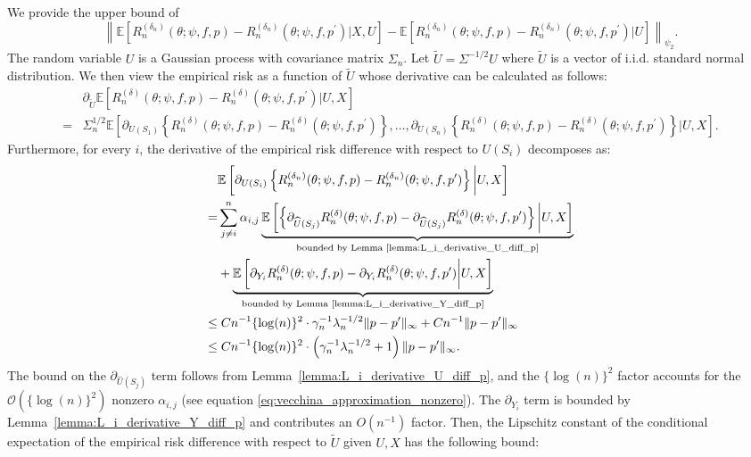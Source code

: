 \documentclass[12pt]{article}
\newcommand{\E}{\mathbb{E}}
\begin{document}
\noindent We provide the upper bound of
$$\left\|\E\left[R_n^{(\delta_n)}(\theta;\psi,f,p)-R_n^{({\delta_n})}(\theta;\psi,f,p^\prime)|X,U\right]-\E\left[R_n^{(\delta_n)}(\theta;\psi,f,p)-R_n^{({\delta_n})}(\theta;\psi,f,p^\prime)|U\right]\right\|_{\psi_2}.$$
The random variable $U$ is a Gaussian process with covariance matrix $\Sigma_n$. Let $\widetilde U=\Sigma^{-1/2} U$ where $\widetilde U$ is a vector of i.i.d. standard normal distribution. We then view the empirical risk as a function of $\widetilde U$ whose derivative can be calculated as follows:
\begin{align*}
    &\partial_{ \widetilde U}\E\left[R_n^{(\delta)}(\theta;\psi,f,p)-R_n^{(\delta)}(\theta;\psi,f,p^\prime)\bigg| U,X\right]\\
    = & \Sigma_n^{1/2}\E\left[\partial_{U(S_1)}\left\{R_n^{(\delta)}(\theta;\psi,f,p)-R_n^{(\delta)}(\theta;\psi,f,p^\prime)\right\},\ldots,\partial_{U(S_n)}\left\{R_n^{(\delta)}(\theta;\psi,f,p)-R_n^{(\delta)}(\theta;\psi,f,p^\prime)\right\}\bigg| U,X\right].
\end{align*}
Furthermore, for every $i$, the derivative of the empirical risk difference with respect to $U(S_i)$ decomposes as:
\begin{align*}
    &\E\left[\partial_{U(S_i)}\left\{R_n^{(\delta_n)}(\theta;\psi,f,p)-R_n^{({\delta_n})}(\theta;\psi,f,p^\prime)\right\}\bigg| U,X\right]\\
    = & \sum_{j\neq i}^n  \alpha_{i,j}\underbrace{\E\left[\left\{\partial_{\widehat U(S_j)}R_n^{(\delta)}(\theta;\psi,f,p)-\partial_{\widehat U(S_j)}R_n^{(\delta)}(\theta;\psi,f,p^\prime)\right\}\bigg| U,X\right]}_{\text{bounded by Lemma \ref{lemma:L_i_derivative_U_diff_p}}}\\
    &+ \underbrace{\E\left[\partial_{Y_i}R_n^{(\delta)}(\theta;\psi,f,p)   - \partial_{Y_i}R_n^{(\delta)}(\theta;\psi,f,p^\prime)\bigg| U,X\right]}_{\text{bounded by Lemma \ref{lemma:L_i_derivative_Y_diff_p}}}\\
    \leq &\;Cn^{-1}\{\log(n)\}^2\cdot\gamma_n^{-1}\lambda_n^{-1/2}\|p-p^\prime\|_\infty + Cn^{-1}\|p-p^\prime\|_\infty\\
    \leq &\;Cn^{-1}\{\log(n)\}^2\cdot\left(\gamma_n^{-1}\lambda_n^{-1/2}+1\right)\|p-p^\prime\|_\infty.
\end{align*}
The bound on the $\partial_{\widehat U(S_j)}$ term follows from Lemma~\ref{lemma:L_i_derivative_U_diff_p}, and the $\{\log(n)\}^2$ factor accounts for the $\mathcal{O}(\{\log(n)\}^2)$ nonzero $\alpha_{i,j}$ (see equation \eqref{eq:vecchina_approximation_nonzero}). The $\partial_{Y_i}$ term is bounded by Lemma~\ref{lemma:L_i_derivative_Y_diff_p} and contributes an $O(n^{-1})$ factor. Then, the Lipschitz constant of the conditional expectation of the empirical risk difference with respect to $\widetilde U$ given $U,X$ has the following bound:
\end{document}
